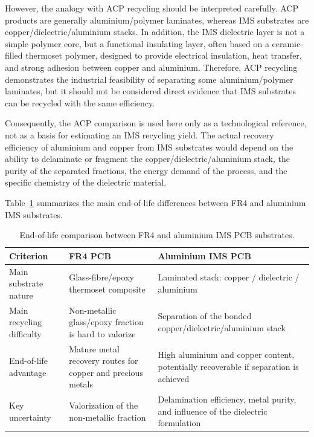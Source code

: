 However, the analogy with ACP recycling should be interpreted carefully. ACP products are generally aluminium/polymer laminates, whereas IMS substrates are copper/dielectric/aluminium stacks. In addition, the IMS dielectric layer is not a simple polymer core, but a functional insulating layer, often based on a ceramic-filled thermoset polymer, designed to provide electrical insulation, heat transfer, and strong adhesion between copper and aluminium. Therefore, ACP recycling demonstrates the industrial feasibility of separating some aluminium/polymer laminates, but it should not be considered direct evidence that IMS substrates can be recycled with the same efficiency.

Consequently, the ACP comparison is used here only as a technological reference, not as a basis for estimating an IMS recycling yield. The actual recovery efficiency of aluminium and copper from IMS substrates would depend on the ability to delaminate or fragment the copper/dielectric/aluminium stack, the purity of the separated fractions, the energy demand of the process, and the specific chemistry of the dielectric material.


\newpage
Table~\ref{tab:fr4_ims_recycling_comparison} summarizes the main end-of-life differences between FR4 and aluminium IMS substrates.

\begin{table}[H]
    \centering
    \caption{End-of-life comparison between FR4 and aluminium IMS PCB substrates.}
    \label{tab:fr4_ims_recycling_comparison}
    \begin{tabular}{|p{3.5cm}|p{5.2cm}|p{5.3cm}|}
        \hline
        \textbf{Criterion} & \textbf{FR4 PCB} & \textbf{Aluminium IMS PCB} \\
        \hline
        Main substrate nature & Glass-fibre/epoxy thermoset composite & Laminated stack: copper / dielectric / aluminium \\
        \hline
        Main recycling difficulty & Non-metallic glass/epoxy fraction is hard to valorize & Separation of the bonded copper/dielectric/aluminium stack \\
        \hline
        End-of-life advantage & Mature metal recovery routes for copper and precious metals & High aluminium and copper content, potentially recoverable if separation is achieved \\
        \hline
        Key uncertainty & Valorization of the non-metallic fraction & Delamination efficiency, metal purity, and influence of the dielectric formulation \\
        \hline
    \end{tabular}
\end{table}

